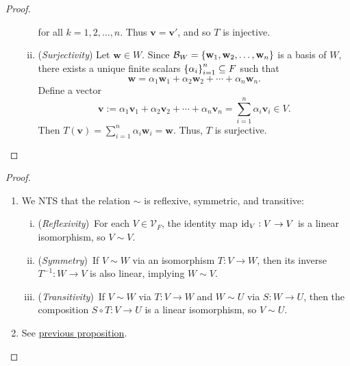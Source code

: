 \documentclass[11pt,openany]{article}
\renewcommand{\vec}[1]{\mathbf{#1}}
\begin{document}
\begin{proof}
\begin{enumerate}[]
\begin{enumerate}[(i)]
\[		\] for all $k=1,2,\dots,n$. Thus $\vec{v}=\vec{v}'$, and so $T$ is injective. 
		\newpage
		\item (\textit{Surjectivity}) Let $\vec{w}\in W$. Since $\basis_W=\set{\vec{w}_1,\vec{w}_2,\dots,\vec{w}_n}$ is a basis of $W$, there exists a unique finite scalars $\set{\alpha_i}_{i=1}^n\subseteq F$ such that \[
		\vec{w}=\alpha_1\vec{w}_1+\alpha_2\vec{w}_2+\cdots+\alpha_n\vec{w}_n.
		\] Define a vector \[
		\vec{v}:=\alpha_1\vec{v}_1+\alpha_2\vec{v}_2+\cdots+\alpha_n\vec{v}_n=\sum_{i=1}^n\alpha_i\vec{v}_i\in V.
		\] Then $T(\vec{v})=\sum_{i=1}^n\alpha_i\vec{w}_i=\vec{w}$. Thus, $T$ is surjective.
	\end{enumerate}
\end{enumerate}
\end{proof}
\begin{proof}
\ \begin{enumerate}[(1)]
	\item We NTS that the relation $\sim$ is reflexive, symmetric, and transitive: \begin{enumerate}[(i)]
		\item (\textit{Reflexivity})\ For each $V\in\mathcal{V}_F$, the identity map $\textnormal{id}_V:V\to V$ is a linear isomorphism, so $V\sim V$.
		\item (\textit{Symmetry})\ If $V\sim W$ via an isomorphism $T:V\to W$, then its inverse $T^{-1}:W\to V$ is also linear, implying $W\sim V$.
		\item (\textit{Transitivity})\ If $V\sim W$ via $T:V\to W$ and $W\sim U$ via $S:W\to U$, then the composition $S\circ T:V\to U$ is a linear isomorphism, so $V\sim U$.
	\end{enumerate}
	\item See \hyperlink{prop}{previous proposition}.
\end{enumerate}
\end{proof}
\end{document}
